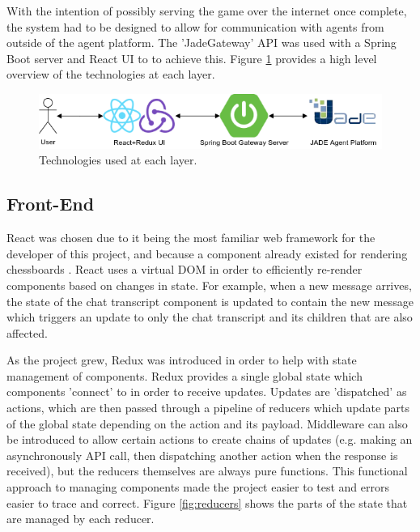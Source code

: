 \documentclass{article}
\begin{document}
With the intention of possibly serving the game over the internet once complete, the system had to be designed to allow for communication with agents from outside of the agent platform. The 'JadeGateway' API was used with a Spring Boot server and React UI to to achieve this. Figure \ref{fig:highlevelarchitecture} provides a high level overview of the technologies at each layer.

\begin{figure}[!ht]
	\centering
	\includegraphics[width=\linewidth]{images/highlevelarchitecture}
	\caption{Technologies used at each layer.}
	\label{fig:highlevelarchitecture}
\end{figure}

\subsection{Front-End}

React \cite{reactjs} was chosen due to it being the most familiar web framework for the developer of this project, and because a component already existed for rendering chessboards \cite{chessboardjsx}. React uses a virtual DOM in order to efficiently re-render components based on changes in state. For example, when a new message arrives, the state of the chat transcript component is updated to contain the new message which triggers an update to only the chat transcript and its children that are also affected. 

As the project grew, Redux \cite{redux} was introduced in order to help with state management of components. Redux provides a single global state which components 'connect' to in order to receive updates. Updates are 'dispatched' as actions, which are then passed through a pipeline of reducers which update parts of the global state depending on the action and its payload. Middleware can also be introduced to allow certain actions to create chains of updates (e.g. making an asynchronously API call, then dispatching another action when the response is received), but the reducers themselves are always pure functions. This functional approach to managing components made the project easier to test and errors easier to trace and correct. Figure \ref{fig:reducers} shows the parts of the state that are managed by each reducer.
\end{document}
